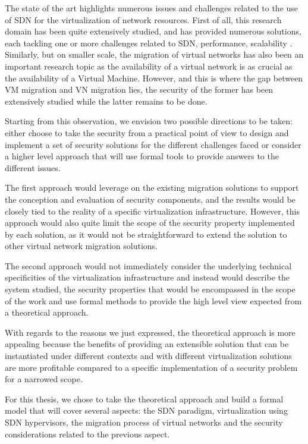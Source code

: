 The state of the art highlights numerous issues and challenges related to the use of SDN for the virtualization of network resources.
First of all, this research domain has been quite extensively studied, and has provided numerous solutions, each tackling one or more challenges related to SDN, performance, scalability \etc.
Similarly, but on smaller scale, the migration of virtual networks has also been an important research topic as the availability of a virtual network is as crucial as the availability of a Virtual Machine.
However, and this is where the gap between VM migration and VN migration lies, the security of the former has been extensively studied while the latter remains to be done.

Starting from this observation, we envision two possible directions to be taken: either choose to take the security from a practical point of view to  design and implement a set of security solutions for the different challenges faced or consider a higher level approach that will use formal tools to provide answers to the different issues. 

The first approach would leverage on the existing migration solutions to support the conception and evaluation of security components, and the results would be closely tied to the reality of a specific virtualization infrastructure. However, this approach would also quite limit the scope of the security property implemented by each solution, as it would not be straightforward to extend the solution to other virtual network migration solutions.


The second approach would not immediately consider the underlying technical specificities of the virtualization infrastructure and instead would describe the system studied, the security properties that would be encompassed in the scope of the work and use formal methods to provide the high level view expected from a theoretical approach.

With regards to the reasons we just expressed, the theoretical approach is more appealing because the benefits of providing an extensible solution that can be instantiated under different contexts and with different virtualization solutions are more profitable compared to a specific implementation of a security problem for a narrowed scope.

For this thesis, we chose to take the theoretical approach and build a formal model that will cover several aspects: the SDN paradigm, virtualization using SDN hypervisors, the migration process of virtual networks and the security considerations related to the previous aspect.

